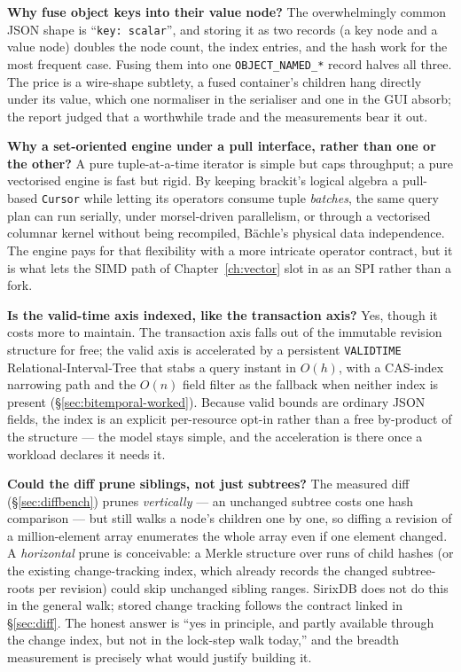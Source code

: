 \documentclass[11pt,a4paper,oneside]{report}
\theoremstyle{sirixthm}
\newcommand{\code}[1]{\texttt{#1}}
\begin{document}
\textbf{Why fuse object keys into their value node?} The overwhelmingly common JSON shape is
``\code{key: scalar}'', and storing it as two records (a key node and a value node) doubles the node
count, the index entries, and the hash work for the most frequent case. Fusing them into one
\code{OBJECT\_NAMED\_*} record halves all three. The price is a wire-shape subtlety, a fused container's
children hang directly under its value, which one normaliser in the serialiser and one in the GUI absorb;
the report judged that a worthwhile trade and the measurements bear it out.

\textbf{Why a set-oriented engine under a pull interface, rather than one or the other?} A pure
tuple-at-a-time iterator is simple but caps throughput; a pure vectorised engine is fast but rigid. By
keeping brackit's logical algebra a pull-based \code{Cursor} while letting its operators consume tuple
\emph{batches}, the same query plan can run serially, under morsel-driven parallelism, or through a
vectorised columnar kernel without being recompiled, B\"achle's physical data independence. The engine
pays for that flexibility with a more intricate operator contract, but it is what lets the SIMD path of
Chapter~\ref{ch:vector} slot in as an SPI rather than a fork.

\textbf{Is the valid-time axis indexed, like the transaction axis?} Yes, though it costs more to
maintain. The transaction axis falls out of the immutable revision structure for free; the valid axis is
accelerated by a persistent \code{VALIDTIME} Relational-Interval-Tree that stabs a query instant in
$O(h)$, with a CAS-index narrowing path and the $O(n)$ field filter as the fallback when neither index is
present (\S\ref{sec:bitemporal-worked}). Because valid bounds are ordinary JSON fields, the index is an
explicit per-resource opt-in rather than a free by-product of the structure --- the model stays simple,
and the acceleration is there once a workload declares it needs it.

\textbf{Could the diff prune siblings, not just subtrees?} The measured diff (\S\ref{sec:diffbench}) prunes
\emph{vertically} --- an unchanged subtree costs one hash comparison --- but still walks a node's children
one by one, so diffing a revision of a million-element array enumerates the whole array even if one element
changed. A \emph{horizontal} prune is conceivable: a Merkle structure over runs of child hashes (or the
existing change-tracking index, which already records the changed subtree-roots per revision) could skip
unchanged sibling ranges. SirixDB does not do this in the general walk; stored change tracking
follows the contract linked in \S\ref{sec:diff}. The honest
answer is ``yes in principle, and partly available through the change index, but not in the lock-step walk
today,'' and the breadth measurement is precisely what would justify building it.
\end{document}
